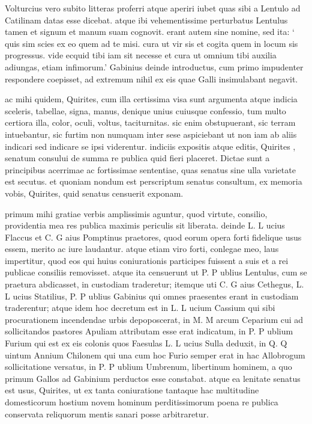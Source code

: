  Volturcius vero subito litteras proferri atque aperiri iubet quas sibi a Lentulo ad Catilinam datas esse dicebat. atque ibi vehementissime perturbatus Lentulus tamen et signum et manum suam cognovit. erant autem sine nomine, sed ita: ` quis sim scies ex eo quem ad te misi. cura ut vir sis et cogita quem in locum sis progressus. vide ecquid tibi iam sit necesse et cura ut omnium tibi auxilia adiungas, etiam infimorum.' Gabinius deinde introductus, cum primo impudenter respondere coepisset, ad extremum nihil ex eis quae Galli insimulabant negavit.

 ac mihi quidem, Quirites, cum illa certissima visa sunt argumenta atque indicia sceleris, tabellae, signa, manus, denique unius cuiusque confessio, tum multo certiora illa, color, oculi, voltus, taciturnitas. sic enim obstupuerant, sic terram intuebantur, sic furtim non numquam inter sese aspiciebant ut non iam ab aliis indicari sed indicare se ipsi viderentur. indiciis expositis atque editis, Quirites , senatum consului de summa re publica quid fieri placeret. Dictae sunt a principibus acerrimae ac fortissimae sententiae, quas senatus sine ulla varietate est secutus. et quoniam nondum est perscriptum senatus consultum, ex memoria vobis, Quirites, quid senatus censuerit exponam.

 primum mihi gratiae verbis amplissimis aguntur, quod virtute, consilio, providentia mea res publica maximis periculis sit liberata. deinde L. L ucius Flaccus et C. G aius Pomptinus praetores, quod eorum opera forti fidelique usus essem, merito ac iure laudantur. atque etiam viro forti, conlegae meo, laus impertitur, quod eos qui huius coniurationis participes fuissent a suis et a rei publicae consiliis removisset. atque ita censuerunt ut P. P ublius Lentulus, cum se praetura abdicasset, in custodiam traderetur; itemque uti C. G aius Cethegus, L. L ucius Statilius, P. P ublius Gabinius qui omnes praesentes erant in custodiam traderentur; atque idem hoc decretum est in L. L ucium Cassium qui sibi procurationem incendendae urbis depoposcerat, in M. M arcum Ceparium cui ad sollicitandos pastores Apuliam attributam esse erat indicatum, in P. P ublium Furium qui est ex eis colonis quos Faesulas L. L ucius Sulla deduxit, in Q. Q uintum Annium Chilonem qui una cum hoc Furio semper erat in hac Allobrogum sollicitatione versatus, in P. P ublium Umbrenum, libertinum hominem, a quo primum Gallos ad Gabinium perductos esse constabat. atque ea lenitate senatus est usus, Quirites, ut ex tanta coniuratione tantaque hac multitudine domesticorum hostium novem hominum perditissimorum poena re publica conservata reliquorum mentis sanari posse arbitraretur.

